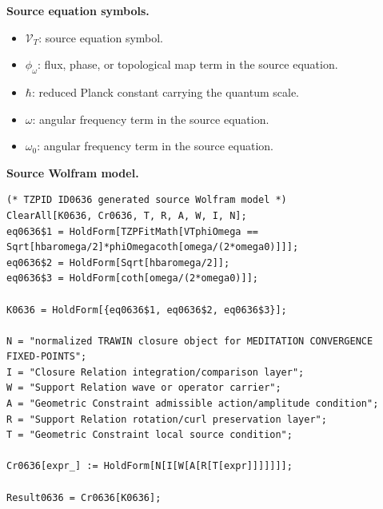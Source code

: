 \begin{minipage}[t]{0.49\linewidth}
\begingroup
\small
\raggedright
\textbf{Source equation symbols.}\par
\begin{itemize}[leftmargin=1.35em,itemsep=1pt,topsep=1pt,parsep=0pt]
    \item $\mathcal{V}_T$: source equation symbol.
    \item $\phi_{\omega}$: flux, phase, or topological map term in the source equation.
    \item $\hbar$: reduced Planck constant carrying the quantum scale.
    \item $\omega$: angular frequency term in the source equation.
    \item $\omega_0$: angular frequency term in the source equation.
\end{itemize}
\endgroup
\end{minipage}\hfill
\begin{minipage}[t]{0.47\linewidth}
\begingroup
\scriptsize
\raggedright
\textbf{Source Wolfram model.}\par
\begin{Verbatim}[fontsize=\tiny,breaklines=true,breakanywhere=true]
(* TZPID ID0636 generated source Wolfram model *)
ClearAll[K0636, Cr0636, T, R, A, W, I, N];
eq0636$1 = HoldForm[TZPFitMath[VTphiOmega == Sqrt[hbaromega/2]*phiOmegacoth[omega/(2*omega0)]]];
eq0636$2 = HoldForm[Sqrt[hbaromega/2]];
eq0636$3 = HoldForm[coth[omega/(2*omega0)]];

K0636 = HoldForm[{eq0636$1, eq0636$2, eq0636$3}];

N = "normalized TRAWIN closure object for MEDITATION CONVERGENCE FIXED-POINTS";
I = "Closure Relation integration/comparison layer";
W = "Support Relation wave or operator carrier";
A = "Geometric Constraint admissible action/amplitude condition";
R = "Support Relation rotation/curl preservation layer";
T = "Geometric Constraint local source condition";

Cr0636[expr_] := HoldForm[N[I[W[A[R[T[expr]]]]]]];

Result0636 = Cr0636[K0636];
\end{Verbatim}
\endgroup
\end{minipage}

